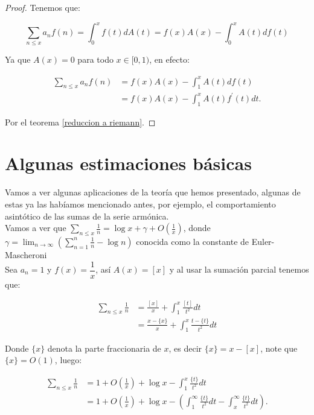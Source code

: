\begin{proof}
Tenemos que:

$$\sum_{n \leq x} a_n f(n)=\int_0^xf(t)dA(t)=f(x)A(x)-\int_0^xA(t)df(t)$$

Ya que $A(x)=0$ para todo $x\in [0,1)$, en efecto:

\begin{align*}
    \sum_{n \leq x} a_n f(n)&=f(x)A(x)-\int_1^xA(t)df(t)\\
    &=f(x)A(x)-\int_1^xA(t)f^{'}(t)dt
.\end{align*}

Por  el teorema \ref{reduccion a riemann}.
\end{proof}

\section{Algunas estimaciones básicas}

Vamos a ver algunas aplicaciones de la teoría que hemos presentado, algunas de estas ya las habíamos mencionado antes, por ejemplo, el comportamiento asintótico de las sumas de la serie armónica.\\

Vamos a ver que $\displaystyle\sum_{n \leq x} \frac{1}{n} =\log x+\gamma+O\left(\frac{1}{x}\right)$, donde $\gamma=\displaystyle\lim_{n \to \infty} \left( \sum_{n=1}^{n}\frac{1}{n} -\log n\right)$ conocida como la constante de Euler-Mascheroni\\

Sea $a_n=1$ y $f(x)=\dfrac{1}{x}$, así $A(x)=[x]$ y al usar la sumación parcial tenemos que:


$$
\begin{aligned}
\sum_{n \leq x} \frac{1}{n} & =\frac{[x]}{x}+\int_1^x \frac{[t]}{t^2} d t \\
& =\frac{x-\{x\}}{x}+\int_1^x \frac{t-\{t\}}{t^2} d t
\end{aligned}
$$

Donde $\{x\}$ denota la parte fraccionaria de $x$, es decir $\{x\}=x-[x]$, note que $\{x\}=O(1)$, luego:

\begin{align*}
   \sum_{n \leq x} \frac{1}{n}&=1+O\left(\frac{1}{x}\right)+\log x-\int_1^x \frac{\{t\}}{t^2} d t\\
   &=1+O\left(\frac{1}{x}\right)+\log x-\left(\int_1^{\infty} \frac{\{t\}}{t^2} d t-\int_x^{\infty} \frac{\{t\}}{t^2} d t\right)
.\end{align*}

